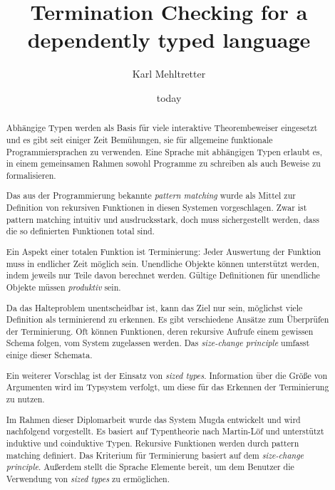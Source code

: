\documentclass[a4paper,11pt]{report}
\theoremstyle{remark}
\newcommand{\mugda}{\textsf{Mugda} }
\begin{document}






\title{Termination Checking for a dependently typed language}
\author{Karl Mehltretter}
\date{today}
\renewcommand{\abstractname}{Inhalt}
\begin{abstract}
Abh\"angige Typen werden als Basis f\"ur viele interaktive Theorembeweiser eingesetzt und es gibt seit einiger Zeit Bem\"uhungen, sie f\"ur allgemeine funktionale Programmiersprachen zu verwenden.
Eine Sprache mit abh\"angigen Typen erlaubt es, in einem gemeinsamen Rahmen sowohl Programme zu schreiben als auch Beweise zu formalisieren.

Das aus der Programmierung bekannte \emph{pattern matching} wurde als Mittel zur Definition von
rekursiven Funktionen in diesen Systemen vorgeschlagen.
Zwar ist pattern matching intuitiv und ausdrucksstark, doch muss sicher\-gestellt werden, dass die so definierten Funktionen total sind.

Ein Aspekt einer totalen Funktion ist Terminierung: Jeder Auswertung der Funktion muss in endlicher Zeit m\"oglich sein.  Unendliche Objekte k\"onnen unterst\"utzt werden, indem jeweils nur Teile davon berechnet werden.
G\"ultige Definitionen f\"ur unendliche Objekte m\"ussen \emph{produktiv} sein.

Da das Halteproblem unentscheidbar ist, kann das Ziel nur sein, m\"og\-lichst viele Definition als terminierend zu erkennen. Es gibt verschiedene Ans\"atze zum \"Uberpr\"ufen der Terminierung.
Oft k\"onnen Funktionen, deren rekursive Aufrufe einem gewissen Schema folgen,
 vom System zugelassen werden. Das \emph{size-change principle} umfasst einige dieser Schemata. 

Ein weiterer Vorschlag ist der Einsatz von \emph{sized types}. Information \"uber die Gr\"o\ss e von Argumenten wird im Typsystem verfolgt, um diese f\"ur das Erkennen der Terminierung zu nutzen.   

Im Rahmen dieser Diplomarbeit wurde das System \mugda ent\-wickelt und wird nachfolgend vorgestellt.
Es basiert auf Typentheorie nach Martin-L\"of und unterst\"utzt induktive und coinduktive Typen. Rekursive Funktionen werden  durch pattern matching definiert.
Das Kriterium f\"ur Terminierung basiert auf dem \emph{size-change principle}.
Au\ss erdem stellt die Sprache Elemente bereit, um dem Benutzer die Verwendung von \emph{sized types} zu erm\"oglichen.
\end{abstract}
\newpage
\end{document}

